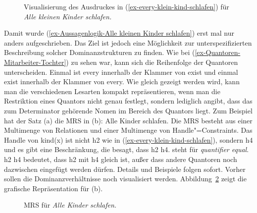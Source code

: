 \begin{figure}
\caption{Visualisierung des Ausdruckes in (\ref{ex-every-klein-kind-schlafen}) für \emph{Alle kleinen Kinder schlafen.}}\label{fig-Alle
  kleinen Kinder schlafen-geskopte-MRS}
\end{figure}
Damit wurde (\ref{ex-Aussagenlogik-Alle kleinen Kinder schlafen}) erst mal nur anders
aufgeschrieben. Das Ziel ist jedoch eine Möglichkeit zur unterspezifizierten Beschreibung solcher
Dominanzstrukturen zu finden. Wie bei (\ref{ex-Quantoren-Mitarbeiter-Tochter}) zu sehen war, kann
sich die Reihenfolge der Quantoren unterscheiden. Einmal ist every innerhalb der Klammer von exist
und einmal exist innerhalb der Klammer von every. Wie gleich gezeigt werden wird, kann man die
verschiedenen Lesarten kompakt repräsentieren, wenn man die Restriktion eines Quantors nicht genau
festlegt, sondern lediglich angibt, dass das zum Determinator gehörende Nomen im Bereich des
Quantors liegt. Zum Beispiel hat der Satz (a) die MRS in (b):
\eal
\ex Alle Kinder schlafen.
\ex {}
\zl
Die MRS besteht aus einer Multimenge von Relationen und einer Multimenge von Handle"=Constraints.
Das Handle von kind(x) ist nicht h2 wie in (\ref{ex-every-klein-kind-schlafen}), sondern
h4 und es gibt eine Beschränkung, die besagt, dass h2 \qeq h4. \qeq steht für \emph{quantifier
  equal}. h2 \qeq h4 bedeutet, dass h2 mit h4 gleich ist, außer dass andere Quantoren noch
dazwischen eingefügt werden dürfen. Details und Beispiele folgen sofort. Vorher sollen die Dominanzverhältnisse
noch visualisiert werden. Abbildung~\ref{fig-Alle Kinder schlafen-MRS} zeigt die grafische
Repräsentation für (b). 
\begin{figure}
\caption{MRS für \emph{Alle Kinder schlafen.}}\label{fig-Alle Kinder schlafen-MRS}
\end{figure}
